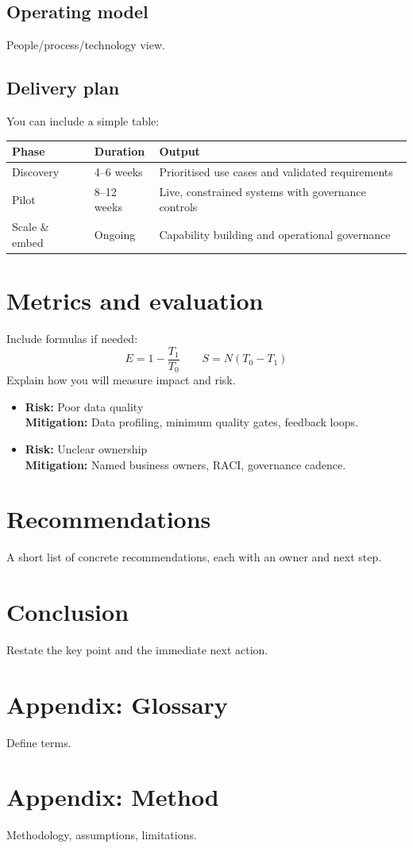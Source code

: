 \documentclass[11pt,a4paper]{article}
\begin{document}
\subsection{Operating model}
People/process/technology view.

\subsection{Delivery plan}
You can include a simple table:

\begin{table}[h]
\centering
\begin{tabularx}{\textwidth}{@{}l l X@{}}
\toprule
Phase & Duration & Output \\
\midrule
Discovery & 4--6 weeks & Prioritised use cases and validated requirements \\
Pilot & 8--12 weeks & Live, constrained systems with governance controls \\
Scale \& embed & Ongoing & Capability building and operational governance \\
\bottomrule
\end{tabularx}
\end{table}

\section{Metrics and evaluation}
Include formulas if needed:
\[
E = 1 - \frac{T_1}{T_0}
\qquad
S = N (T_0 - T_1)
\]
Explain how you will measure impact and risk.

\begin{riskbox}
\begin{itemize}
  \item \textbf{Risk:} Poor data quality \\
        \textbf{Mitigation:} Data profiling, minimum quality gates, feedback loops.
  \item \textbf{Risk:} Unclear ownership \\
        \textbf{Mitigation:} Named business owners, RACI, governance cadence.
\end{itemize}
\end{riskbox}

\section{Recommendations}
A short list of concrete recommendations, each with an owner and next step.

\section{Conclusion}
Restate the key point and the immediate next action.

\appendix
\section{Appendix: Glossary}
Define terms.

\section{Appendix: Method}
Methodology, assumptions, limitations.

\printbibliography
\end{document}
